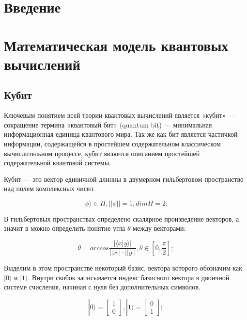 \documentclass[14pt]{article}
\newcommand{\anonsection}[1]{\section*{#1}\addcontentsline{toc}{section}{#1}}
\begin{document}
	\tableofcontents 
	
	\newpage
	\anonsection{Введение}
	

	
	\newpage
	\section{Математическая модель квантовых вычислений}
	\subsection{Кубит}
	
	Ключевым понятием всей теории квантовых вычислений является «кубит» — сокращение термина «квантовый бит» (quantum bit) — минимальная информационная единица квантового мира. Так же как бит является частичкой информации, содержащейся в простейшем содержательном классическом вычислительном процессе, кубит является описанием простейшей содержательной квантовой системы.
	
Кубит — это вектор единичной длинны в двумерном гильбертовом пространстве над полем комплексных чисел.
	
	\begin{equation}
	|\phi \rangle \in H, ||\phi|| = 1, dimH = 2;	
	\end{equation}
	
	В гильбертовых пространствах определено скалярное произведение векторов, а значит в можно определить понятие угла $\theta$ между векторами:

	\begin{equation}
	\theta = arccos \frac{ | \langle x|y \rangle | }{||x|| \cdot ||y||}, \theta \in [0, \frac{\pi}{2}];
	\end{equation}

	Выделим в этом пространстве некоторый базис, вектора которого обозначим как $|0 \rangle$ и $|1 \rangle$. Внутри скобок записывается индекс базисного вектора в двоичной системе счисления, начиная с нуля без дополнительных символов.

	\begin{equation}
	|0 \rangle = \begin{bmatrix} 1 \\ 0 \end{bmatrix}, 
	|1 \rangle = \begin{bmatrix} 0 \\ 1 \end{bmatrix};
	\end{equation}
\end{document}
